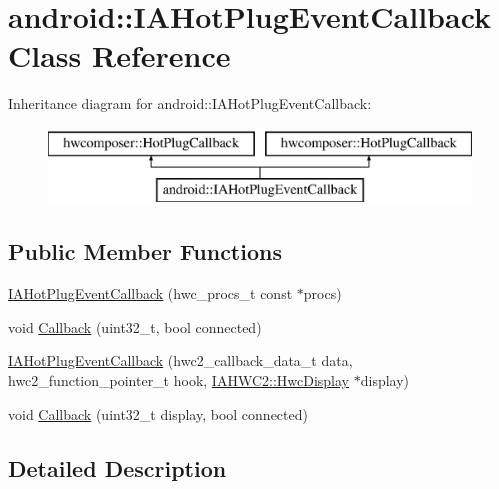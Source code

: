 \hypertarget{classandroid_1_1IAHotPlugEventCallback}{}\section{android\+:\+:I\+A\+Hot\+Plug\+Event\+Callback Class Reference}
\label{classandroid_1_1IAHotPlugEventCallback}
Inheritance diagram for android\+:\+:I\+A\+Hot\+Plug\+Event\+Callback\+:\begin{figure}[H]
\begin{center}
\leavevmode
\includegraphics[height=2.000000cm]{classandroid_1_1IAHotPlugEventCallback}
\end{center}
\end{figure}
\subsection*{Public Member Functions}
\begin{DoxyCompactItemize}
\item 
\mbox{\hyperlink{classandroid_1_1IAHotPlugEventCallback_a90284f657664842ccaa6eabe5dba38d8}{I\+A\+Hot\+Plug\+Event\+Callback}} (hwc\+\_\+procs\+\_\+t const $\ast$procs)
\item 
void \mbox{\hyperlink{classandroid_1_1IAHotPlugEventCallback_af5cbfe8fc04fa828f75153f2b5f548b8}{Callback}} (uint32\+\_\+t, bool connected)
\item 
\mbox{\hyperlink{classandroid_1_1IAHotPlugEventCallback_a359be2fe86c68b5cce9f8d4fac36909a}{I\+A\+Hot\+Plug\+Event\+Callback}} (hwc2\+\_\+callback\+\_\+data\+\_\+t data, hwc2\+\_\+function\+\_\+pointer\+\_\+t hook, \mbox{\hyperlink{classandroid_1_1IAHWC2_1_1HwcDisplay}{I\+A\+H\+W\+C2\+::\+Hwc\+Display}} $\ast$display)
\item 
void \mbox{\hyperlink{classandroid_1_1IAHotPlugEventCallback_a8808ed272ecfd7006c28f0e54d6ba9e4}{Callback}} (uint32\+\_\+t display, bool connected)
\end{DoxyCompactItemize}


\subsection{Detailed Description}


